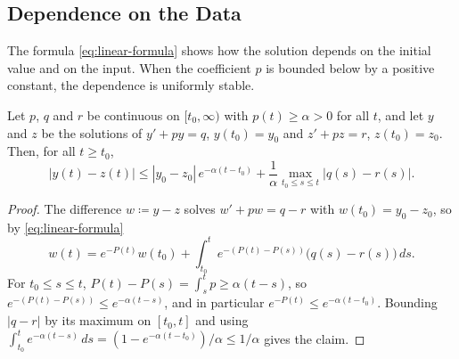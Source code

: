 \begin{figure}
\end{figure}

\subsection{Dependence on the Data}

The formula \eqref{eq:linear-formula} shows how the solution depends on the initial value and on the input. When the coefficient $p$ is bounded below by a positive constant, the dependence is uniformly stable.

\begin{proposition}
\label{prop:linear-dependence}
Let $p$, $q$ and $r$ be continuous on $[t_0,\infty)$ with $p(t)\ge\alpha>0$ for all $t$, and let $y$ and $z$ be the solutions of $y'+py=q$, $y(t_0)=y_0$ and $z'+pz=r$, $z(t_0)=z_0$. Then, for all $t\ge t_0$,
\[
|y(t)-z(t)|\le|y_0-z_0|\,e^{-\alpha(t-t_0)}+\frac1\alpha\max_{t_0\le s\le t}|q(s)-r(s)| .
\]
\end{proposition}

\begin{proof}
The difference $w\coloneqq y-z$ solves $w'+pw=q-r$ with $w(t_0)=y_0-z_0$, so by \eqref{eq:linear-formula}
\[
w(t)=e^{-P(t)}w(t_0)+\int_{t_0}^te^{-(P(t)-P(s))}\bigl(q(s)-r(s)\bigr)\,ds .
\]
For $t_0\le s\le t$, $P(t)-P(s)=\int_s^tp\ge\alpha(t-s)$, so $e^{-(P(t)-P(s))}\le e^{-\alpha(t-s)}$, and in particular $e^{-P(t)}\le e^{-\alpha(t-t_0)}$. Bounding $|q-r|$ by its maximum on $[t_0,t]$ and using $\int_{t_0}^te^{-\alpha(t-s)}\,ds=(1-e^{-\alpha(t-t_0)})/\alpha\le1/\alpha$ gives the claim.
\end{proof}

